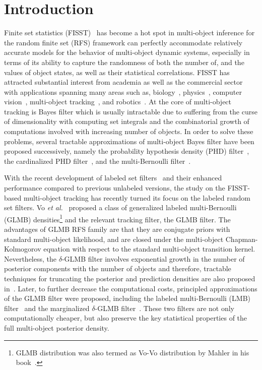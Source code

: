 \documentclass[journal]{IEEEtran}
\begin{document}
\section{Introduction}
Finite set statistics (FISST)~\cite{refr:Mahler_book} has become a hot spot  in multi-object inference for the random finite set (RFS) framework can perfectly accommodate relatively accurate models for the behavior of multi-object dynamic systems, especially in terms of its ability to capture the randomness of both the number of, and the values of object states, as well as their statistical correlations. FISST has attracted
substantial interest from academia as well as the commercial
sector with applications spanning many areas such as, biology~\cite{refr:biology}, physics~\cite{refr:physics}, computer vision~\cite{refr:vedio-tracking}, 
multi-object
tracking~\cite{refr:tracking-1,refr:tracking-2,refr:GCI-MB}, and robotics~\cite{refr:robotics}. At the core of multi-object tracking is Bayes filter which is usually intractable due to suffering from the curse of dimensionality with computing set integrals and the combinatorial growth of computations involved with increasing number of objects.  In order to solve these problems, several tractable approximations of multi-object Bayes filter have been proposed successively, namely the  probability hypothesis density (PHD) filter~\cite{refr:tracking-1,refr:PHD}, the  cardinalized PHD filter~\cite{refr:CPHD,refr:CPHD-2}, and the multi-Bernoulli filter~\cite{refr:Mahler_book,refr:MeMber_filter1,refr:MeMber_filter}.

With the recent development of labeled set  filters~\cite{refr:label_1,refr:label_2,refr:label_3,refr:label_4, refr:label_5, refr:label_6, refr:label_7,Vo-Vo-JMS,robust-distributed-fusion} and their enhanced performance  compared to previous unlabeled versions, 
the study on the FISST-based multi-object tracking has recently turned its focus on the labeled random set filters. Vo \textit{et al.}~\cite{refr:label_1} proposed  a class of generalized labeled multi-Bernoulli (GLMB) densities\footnote{GLMB distribution was also termed as Vo-Vo distribution by Mahler in his book~\cite{refr:tracking-2}.}  and the relevant tracking filter, the GLMB filter.  The advantages of GLMB RFS family are that they are conjugate priors with standard multi-object likelihood, and are closed under the multi-object Chapman-Kolmogorov equation with respect to the standard multi-object transition kernel. 
Nevertheless, the $\delta$-GLMB filter involves exponential growth in the number of posterior components with the number of objects and therefore, tractable techniques for truncating the posterior and prediction densities are also proposed in~\cite{refr:label_2}. Later, to further  decrease the computational costs, principled approximations of the  GLMB filter were proposed, including the labeled multi-Bernoulli (LMB) filter~\cite{refr:label_5} and the marginalized $\delta$-GLMB filter~\cite{refr:label_3}.  These two filters are not only computationally cheaper, but also preserve the key statistical properties of the full multi-object posterior density.
\end{document}
